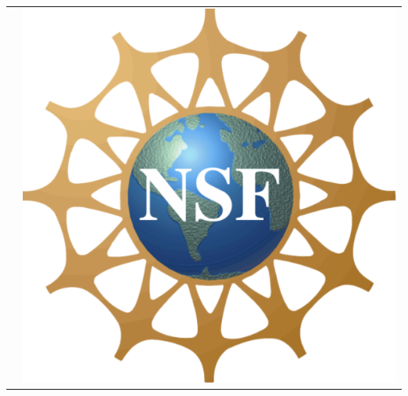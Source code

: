 \documentclass[final]{beamer}
\begin{document}
\begin{frame}[t]
\begin{columns}
\begin{column}{0.25\paperwidth}
\begin{tabular}{cc}
\begin{minipage}{6.5in}
\end{minipage}

& 
\begin{minipage}{2.5in}
\bigskip
\includegraphics[scale=.21]{NSF_logo.png}
\end{minipage}
\end{tabular}
			
		\end{column}
		
		\vspace{1cm}
	
	\end{columns}
	
	
	

\end{frame}
\end{document}
